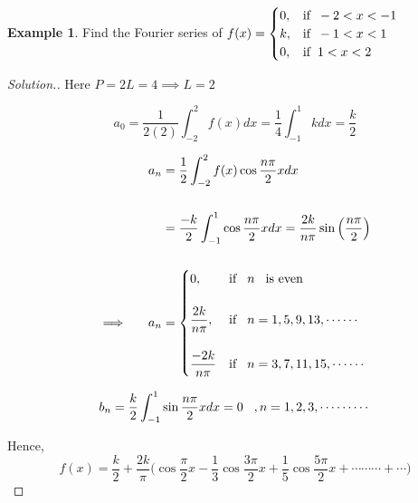 \documentclass[11pt,a4paper]{article}
\theoremstyle{definition}
\newtheorem{exa}[thm]{Example}
\newenvironment{solution}
  {\renewcommand{\qedsymbol}{}\begin{proof}[\textit{Solution}.]}
  {\end{proof}}
\begin{document}
\begin{exa}


Find the Fourier series of\hspace{0.3cm} 
$f(x)= 
\begin{cases}
0, & \text{if}\hspace{0.2cm} -2 < x <-1\\
k, & \text{if}\hspace{0.2cm} -1 < x < 1\\
0, & \text{if}\hspace{0.2cm} 1 < x < 2\\
\end{cases}
$
\end{exa}


\begin{solution}


Here $P = 2L = 4 \implies L = 2$

$$a_0 = \frac{1}{2(2)} \int^2_{-2}f(x)dx = \frac{1}{4}\int^1_{-1} k dx = \frac{k}{2}$$

\begin{align*}
a_n & = \frac{1}{2}\int^2_{-2}f(x)\cos \frac{n\pi}{2}xdx\\\\
& = \frac{-k}{2}\int^1_{-1}\cos \frac{n\pi}{2}xdx = \frac{2k}{n\pi}\sin \Big( \frac{n\pi}{2}\Big)\\\\
\implies \hspace{0.5cm} a_n & = 
\begin{cases}
0, & \text{if} \hspace{0.3cm} n \hspace{0.3cm} \text{is even}\\\\
\dfrac{2k}{n\pi}, & \text{if}\hspace{0.3cm} n = 1,5, 9, 13,\cdots\cdots\\\\
\dfrac{-2k}{n\pi} & \text{if}\hspace{0.3cm} n = 3,7, 11,15,\cdots\cdots\\
\end{cases}\\
\end{align*}

$$b_n = \frac{k}{2}\int^1_{-1} \sin \frac{n\pi}{2}xdx = 0 \hspace{0.3cm}, n= 1,2,3,\cdots\cdots\cdots$$

Hence, $$f(x) = \frac{k}{2} + \frac{2k}{\pi}\Big( \cos \frac{\pi}{2}x - \frac{1}{3}\cos \frac{3\pi}{2}x + \frac{1}{5}\cos \frac{5\pi}{2}x + \cdots\cdots\cdots+ \cdots\Big)$$
\end{solution}
\end{document}

